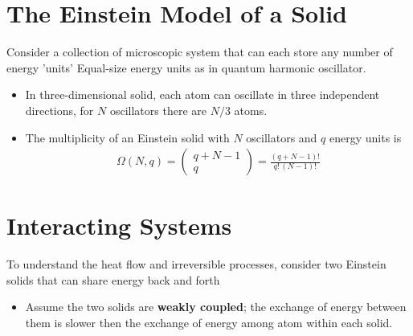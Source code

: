 \documentclass{book}
\begin{document}
\section{The Einstein Model of a Solid}%
\label{sec:einstein model}

Consider a collection of microscopic system that can each store any number of energy 'units'
Equal-size energy units as in quantum harmonic oscillator.
\begin{itemize}
	\item In three-dimensional solid, each atom can oscillate in three independent directions, for $N$
	      oscillators there are $N/3$ atoms.
	\item The multiplicity of an Einstein solid with $N$ oscillators and $q$
	      energy units is
	      \begin{align}
		      \label{eq:einstein omega}
		      \Omega(N, q) = \begin{pmatrix}
			                     q + N -1 \\ q
		                     \end{pmatrix} =
		      \frac{(q+N-1)!}{q! \, (N-1)!}
	      \end{align}
\end{itemize}


\section{Interacting Systems}%
\label{sec:Interacting Systems}

To understand the heat flow and irreversible processes, consider two Einstein solids that can
share energy back and forth

\begin{itemize}
  \item Assume the two solids are \textbf{weakly coupled}; the exchange of energy between them
				is slower then the exchange of energy among atom within each solid.
\end{itemize}
\end{document}
